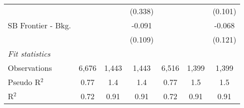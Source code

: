 \begin{tabular}{lcccccc}
                                &                &         & (0.338)       &                &         & (0.101)\\   
   SB Frontier - Bkg.           &                &         & -0.091        &                &         & -0.068\\   
                                &                &         & (0.109)       &                &         & (0.121)\\   
   \midrule
   \emph{Fit statistics}\\
   Observations                 & 6,676          & 1,443   & 1,443         & 6,516          & 1,399   & 1,399\\  
   Pseudo R$^2$                 & 0.77           & 1.4     & 1.4           & 0.77           & 1.5     & 1.5\\  
   R$^2$                        & 0.72           & 0.91    & 0.91          & 0.72           & 0.91    & 0.91\\  
   

\end{tabular}

